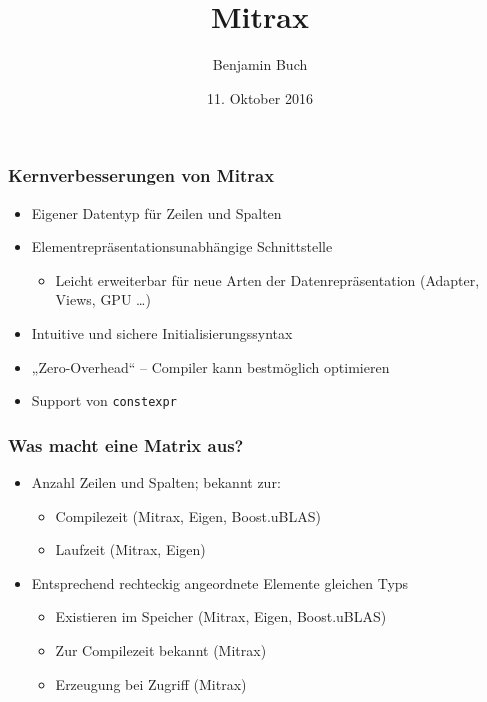 \documentclass{beamer}
\title{Mitrax}
\author{Benjamin Buch}
\date{11. Oktober 2016}
\begin{document}
\begin{frame}
    \frametitle{Kernverbesserungen von Mitrax}
    \begin{itemize}
        \item Eigener Datentyp für Zeilen und Spalten
        \item Elementrepräsentationsunabhängige Schnittstelle
        \begin{itemize}
            \item Leicht erweiterbar für neue Arten der Datenrepräsentation (Adapter, Views, GPU …)
        \end{itemize}
        \item Intuitive und sichere Initialisierungssyntax
        \item „Zero-Overhead“ – Compiler kann bestmöglich optimieren
        \item Support von \texttt{constexpr}
    \end{itemize}
\end{frame}
\begin{frame}
    \frametitle{Was macht eine Matrix aus?}
    \begin{itemize}
        \item Anzahl Zeilen und Spalten; bekannt zur:
        \begin{itemize}
            \item Compilezeit (Mitrax, Eigen, Boost.uBLAS)
            \item Laufzeit (Mitrax, Eigen)
        \end{itemize}
        \item Entsprechend rechteckig angeordnete Elemente gleichen Typs
        \begin{itemize}
            \item Existieren im Speicher (Mitrax, Eigen, Boost.uBLAS)
            \item Zur Compilezeit bekannt (Mitrax)
            \item Erzeugung bei Zugriff (Mitrax)
        \end{itemize}
    \end{itemize}
\end{frame}
\end{document}
